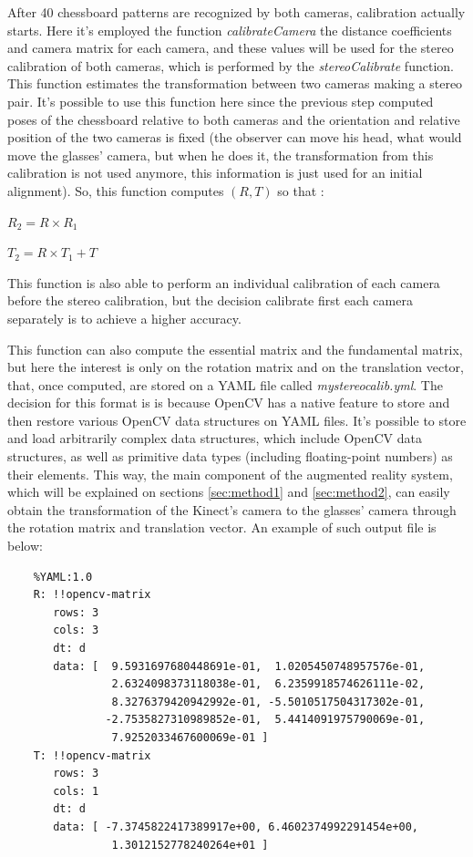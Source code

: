\documentclass[msc, a4paper, classic, en]{ufbathesis}
\begin{document}
After 40 chessboard patterns are recognized by both cameras, calibration actually starts. Here it's employed the function \textit{calibrateCamera} the distance coefficients and camera matrix for each camera, and these values will be used for the stereo calibration of both cameras, which is performed by the \textit{stereoCalibrate} function. This function estimates the transformation between two cameras making a stereo pair. It's possible to use this function here since the previous step computed poses of the chessboard relative to both cameras and the orientation and relative position of the two cameras is fixed (the observer can move his head, what would move the glasses' camera, but when he does it, the transformation from this calibration is not used anymore, this information is just used for an initial alignment). So, this function computes $(R, T)$ so that \cite{opencvsc}:

\begin{center}
$R_2 = R \times R_1$
\end{center}

\begin{center}
$T_2= R \times T_1 + T$
\end{center}

This function is also able to perform an individual calibration of each camera before the stereo calibration, but the decision calibrate first each camera separately is to achieve a higher accuracy.

This function can also compute the essential matrix and the fundamental matrix, but here the interest is only on the rotation matrix and on the translation vector, that, once computed, are stored on a YAML \cite{yaml} file called \textit{mystereocalib.yml}. The decision for this format is is because OpenCV has a native feature to store and then restore various OpenCV data structures on YAML files. It's possible to store and load arbitrarily complex data structures, which include OpenCV data structures, as well as primitive data types (including floating-point numbers) as their elements. This way, the main component of the augmented reality system, which will be explained on sections \ref{sec:method1} and \ref{sec:method2}, can easily obtain the transformation of the Kinect's camera to the glasses' camera through the rotation matrix and translation vector. An example of such output file is below:

\begin{verbatim}
    %YAML:1.0
    R: !!opencv-matrix
       rows: 3
       cols: 3
       dt: d
       data: [  9.5931697680448691e-01,  1.0205450748957576e-01,
                2.6324098373118038e-01,  6.2359918574626111e-02,
                8.3276379420942992e-01, -5.5010517504317302e-01,
               -2.7535827310989852e-01,  5.4414091975790069e-01,
                7.9252033467600069e-01 ]
    T: !!opencv-matrix
       rows: 3
       cols: 1
       dt: d
       data: [ -7.3745822417389917e+00, 6.4602374992291454e+00,
                1.3012152778240264e+01 ]
\end{verbatim}
\end{document}
